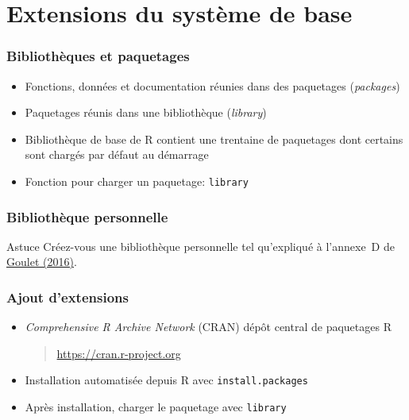 \section{Extensions du système de base}

\begin{frame}
  \frametitle{Bibliothèques et paquetages}

  \begin{itemize}
  \item Fonctions, données et documentation réunies dans des
    \alert{paquetages} (\emph{packages})
  \item Paquetages réunis dans une \alert{bibliothèque}
    (\emph{library})
  \item Bibliothèque de base de R contient une trentaine de paquetages
    dont certains sont chargés par défaut au démarrage
  \item Fonction pour charger un paquetage: \texttt{library}
  \end{itemize}
\end{frame}

\begin{frame}
  \frametitle{Bibliothèque personnelle}

  \begin{alertblock}{Astuce}
    Créez-vous une bibliothèque personnelle tel qu'expliqué à
    l'annexe~D de %
    \href{https://github.com/vigou3/introduction-programmation-r/releases/download/edition-5a/introduction-programmation-r.pdf}{Goulet (2016)}.
  \end{alertblock}
\end{frame}

\begin{frame}
  \frametitle{Ajout d'extensions}

  \begin{itemize}
  \item \emph{Comprehensive R Archive Network} (CRAN) dépôt central de
    paquetages R
    \begin{quote}
      \url{https://cran.r-project.org}
    \end{quote}
  \item Installation automatisée depuis R avec
    \texttt{install.packages}
  \item Après installation, charger le paquetage avec \texttt{library}
  \end{itemize}

  \pause
\end{frame}

